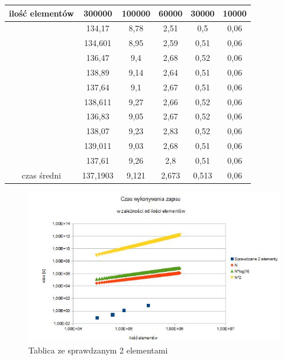 \documentclass[12pt,a4paper,titlepage]{article}
\begin{document}
\begin{center}
\begin {tabular}{|c|c|c|c|c|c|}\hline
ilość elementów&300000&100000&60000&30000&10000\\\hline
&134,17&8,78&2,51&0,5&0,06\\\hline
&134,601&8,95&2,59&0,51&0,06\\\hline
&136,47&9,4&2,68&0,52&0,06\\\hline
&138,89&9,14&2,64&0,51&0,06\\\hline
&137,64&9,1&2,67&0,51&0,06\\\hline
&138,611&9,27&2,66&0,52&0,06\\\hline
&136,83&9,05&2,67&0,52&0,06\\\hline
&138,07&9,23&2,83&0,52&0,06\\\hline
&139,011&9,03&2,68&0,51&0,06\\\hline
&137,61&9,26&2,8&0,51&0,06\\\hline
czas średni&137,1903&9,121&2,673&0,513&0,06\\\hline

\end{tabular}
\end {center}


\begin{figure}[h]
\begin{center}
\includegraphics[scale=0.7]{2_elementy.jpg}
\caption{Tablica ze sprawdzanym 2 elementami}
\end{center}
\end{figure}
\end{document}
